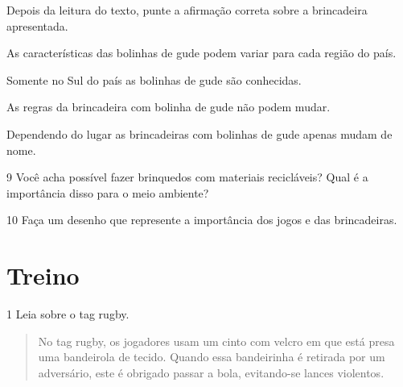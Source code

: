 \noindent{}Depois da leitura do texto, punte a afirmação correta sobre a
brincadeira apresentada.

\begin{escolha}
\item
  As características das bolinhas de gude podem variar para cada região
  do país.
\item
  Somente no Sul do país as bolinhas de gude são conhecidas.
\item
  As regras da brincadeira com bolinha de gude não podem mudar.
\item
  Dependendo do lugar as brincadeiras com bolinhas de gude apenas mudam
  de nome.
\end{escolha}


\num{9} Você acha possível fazer brinquedos com materiais recicláveis? Qual é a importância disso para o meio ambiente?


\num{10} Faça um desenho que represente a importância dos jogos e das brincadeiras.

\begin{mdframed}[linewidth=2pt,linecolor=salmao]
\vspace{4cm}
\end{mdframed}

\section*{Treino}

\num{1} Leia sobre o tag rugby.
\begin{quote}
  No tag rugby, os jogadores usam um cinto com
  velcro em que está presa uma bandeirola de tecido. Quando essa bandeirinha é retirada
  por um adversário, este é obrigado passar a bola, evitando-se lances violentos.

\end{quote}

